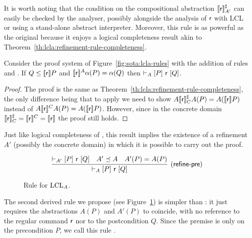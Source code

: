 It is worth noting that the condition on the compositional abstraction $\llbracket\mathsf{r}\rrbracket^{\sharp}_{A'}$ can easily be checked by the analyser, possibly alongside the analysis of $\mathsf{r}$ with LCL or using a stand-alone abstract interpreter.
Moreover, this rule is as powerful as the original  because it enjoys a logical completeness result akin to Theorem~\ref{th:lcla:refinement-rule-completeness}.
\begin{theorem}\label{th:lcla:refine-int-completeness}
	Consider the proof system of Figure~\ref{fig:sota:lcla-rules} with the addition of rules  and . If $Q \le \llbracket\mathsf{r}\rrbracket P$ and $\llbracket\mathsf{r}\rrbracket^A \alpha(P) = \alpha(Q)$ then $\vdash_{A}\nobreak[P]~\mathsf{r}~[Q]$.
\end{theorem}
\begin{proof}
	The proof is the same as Theorem~\ref{th:lcla:refinement-rule-completeness}, the only difference being that to apply  we need to show $A \llbracket\mathsf{r}\rrbracket^{\sharp}_{C} A(P) = A(\llbracket\mathsf{r}\rrbracket P)$ instead of $A \llbracket\mathsf{r}\rrbracket^{C} A(P) = A(\llbracket\mathsf{r}\rrbracket P)$. However, since in the concrete domain $\llbracket\mathsf{r}\rrbracket^{\sharp}_{C} = \llbracket\mathsf{r}\rrbracket^{C} = \llbracket\mathsf{r}\rrbracket$ the proof still holds.
\end{proof}

Just like logical completeness of , this result implies the existence of a refinement $A'$ (possibly the concrete domain) in which it is possible to carry out the proof.

\begin{figure*}[t]
	\begin{framed}
		\[
		\infer[\lclrule{refine\mbox{-}pre}]
		{\lcl{A}{P}{\regr}{Q}}
		{\lcl{A'}{P}{\regr}{Q} \quad A' \preceq A \quad A'(P) = A(P) }
		\]
	\end{framed}
	\vspace{-1ex}
	\caption{Rule  for $\text{LCL}_A$.}\label{fig:lcla:rule-refine-pre}
\end{figure*}

The second derived rule we propose (see Figure~\ref{fig:lcla:rule-refine-pre}) is simpler than : it just requires the abstractions $A(P)$ and $A'(P)$ to coincide, with no reference to the regular command $\mathsf{r}$ nor to the postcondition $Q$. Since the premise is only on the precondition $P$, we call this rule .

